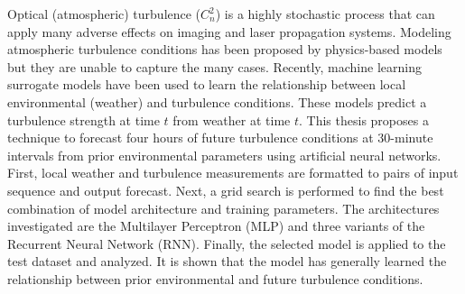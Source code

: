 Optical (atmospheric) turbulence ($C_{n}^{2}$) is a highly stochastic process that can apply many adverse effects on imaging and laser propagation systems. Modeling atmospheric turbulence conditions has been proposed by physics-based models but they are unable to capture the many cases. Recently, machine learning surrogate models have been used to learn the relationship between local environmental (weather) and turbulence conditions. These models predict a turbulence strength at time $t$ from weather at time $t$. This thesis proposes a technique to forecast four hours of future turbulence conditions at 30-minute intervals from prior environmental parameters using artificial neural networks. First, local weather and turbulence measurements are formatted to pairs of input sequence and output forecast. Next, a grid search is performed to find the best combination of model architecture and training parameters. The architectures investigated are the Multilayer Perceptron (MLP) and three variants of the Recurrent Neural Network (RNN). Finally, the selected model is applied to the test dataset and analyzed. It is shown that the model has generally learned the relationship between prior environmental and future turbulence conditions.